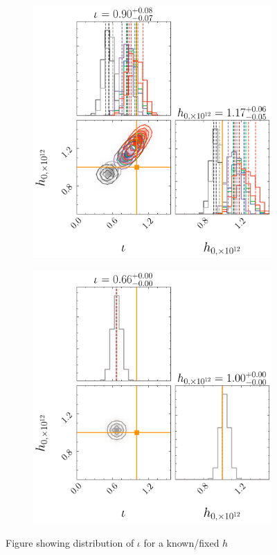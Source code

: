 \documentclass[fleqn,usenatbib,useAMS]{mnras}
\begin{document}
\begin{figure}
	
	
		\begin{subfigure}[b]{0.48\textwidth}
		\includegraphics[width=\textwidth]{images/stacked_GW_plot_iota_h}
		\caption{}
		\label{fig:example1_iota}
	\end{subfigure} 
	\hfill
	\begin{subfigure}[b]{0.48\textwidth}
		\includegraphics[width=\textwidth]{images/stacked_GW_plot_iota_h_fixed}
		\caption{}
		\label{fig:example2_iota}
	\end{subfigure}
	
	

	
	\caption{Figure showing distribution of $\iota$ for a known/fixed $h$}
	\label{fig:iota}
\end{figure}
\end{document}
